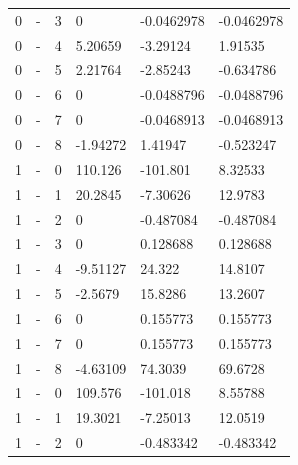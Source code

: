 \begin{longtable}
{}0 & \allowbreak{}-\allowbreak{} & 3 & 0 & -0.0462978 & -0.0462978 \\
{}0 & \allowbreak{}-\allowbreak{} & 4 & 5.20659 & -3.29124 & 1.91535 \\
{}0 & \allowbreak{}-\allowbreak{} & 5 & 2.21764 & -2.85243 & -0.634786 \\
{}0 & \allowbreak{}-\allowbreak{} & 6 & 0 & -0.0488796 & -0.0488796 \\
{}0 & \allowbreak{}-\allowbreak{} & 7 & 0 & -0.0468913 & -0.0468913 \\
{}0 & \allowbreak{}-\allowbreak{} & 8 & -1.94272 & 1.41947 & -0.523247 \\
{}1 & \allowbreak{}-\allowbreak{} & 0 & 110.126 & -101.801 & 8.32533 \\
{}1 & \allowbreak{}-\allowbreak{} & 1 & 20.2845 & -7.30626 & 12.9783 \\
{}1 & \allowbreak{}-\allowbreak{} & 2 & 0 & -0.487084 & -0.487084 \\
{}1 & \allowbreak{}-\allowbreak{} & 3 & 0 & 0.128688 & 0.128688 \\
{}1 & \allowbreak{}-\allowbreak{} & 4 & -9.51127 & 24.322 & 14.8107 \\
{}1 & \allowbreak{}-\allowbreak{} & 5 & -2.5679 & 15.8286 & 13.2607 \\
{}1 & \allowbreak{}-\allowbreak{} & 6 & 0 & 0.155773 & 0.155773 \\
{}1 & \allowbreak{}-\allowbreak{} & 7 & 0 & 0.155773 & 0.155773 \\
{}1 & \allowbreak{}-\allowbreak{} & 8 & -4.63109 & 74.3039 & 69.6728 \\
{}1 & \allowbreak{}-\allowbreak{} & 0 & 109.576 & -101.018 & 8.55788 \\
{}1 & \allowbreak{}-\allowbreak{} & 1 & 19.3021 & -7.25013 & 12.0519 \\
{}1 & \allowbreak{}-\allowbreak{} & 2 & 0 & -0.483342 & -0.483342 \\

\end{longtable}

